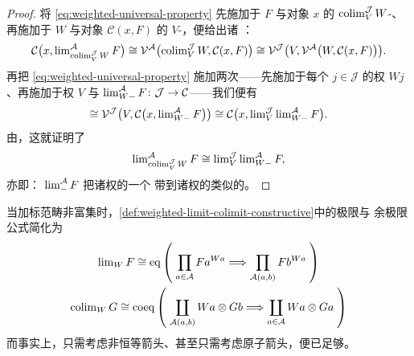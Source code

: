 \begin{proof}
将\trUniversalProperty{} \eqref{eq:weighted-universal-property} 先施加于%
\trDiagram{} $F$ 与对象 $x$ 的 $\operatorname{colim}^{\mathcal{J}}_{V}W$-\trWeightedLimit、再施加于%
\trDiagram{} $W$ 与对象 $\mathcal{C}(x,F)$ 的 $V$-\trWeightedColimit，便给出诸%
\trIsomorphism：
\[ \mathcal{C}\bigl(x,\operatorname{lim}^{\mathcal{A}}_{\operatorname{colim}^{\mathcal{J}}_{V}W}F\bigr)
   \cong\mathcal{V}^{\mathcal{A}}\bigl(\operatorname{colim}^{\mathcal{J}}_{V}W,\mathcal{C}(x,F)\bigr)
   \cong\mathcal{V}^{\mathcal{J}}\bigl(V,\mathcal{V}^{\mathcal{A}}\bigl(W,\mathcal{C}(x,F)\bigr)\bigr). \]
再把 \eqref{eq:weighted-universal-property} 施加两次——先施加于每个
$j\in\mathcal{J}$ 的权 $Wj$、再施加于权 $V$ 与\trDiagram{}
$\operatorname{lim}^{\mathcal{A}}_{W-}F\colon\mathcal{J}\to\mathcal{C}$——我们便有
\[ \cong\mathcal{V}^{\mathcal{J}}\bigl(V,\mathcal{C}\bigl(x,\operatorname{lim}^{\mathcal{A}}_{W-}F\bigr)\bigr)
   \cong\mathcal{C}\bigl(x,\operatorname{lim}^{\mathcal{J}}_{V}\operatorname{lim}^{\mathcal{A}}_{W-}F\bigr). \]
由\trYonedaLemma，这就证明了
\[ \operatorname{lim}^{\mathcal{A}}_{\operatorname{colim}^{\mathcal{J}}_{V}W}F
   \cong\operatorname{lim}^{\mathcal{J}}_{V}\operatorname{lim}^{\mathcal{A}}_{W-}F, \]
亦即：\trWeightedLimit{}\trFunctor{} $\operatorname{lim}^{\mathcal{A}}_{-}F$ 把诸权的一个%
\trWeightedColimit{}带到诸权的类似的\trWeightedLimit。
\end{proof}

\begin{remark}[对非富集的加标范畴]\label{rem:unenriched-indexing-categories}
当加标范畴非富集时，\cref{def:weighted-limit-colimit-constructive}中的极限与
余极限公式简化为
\begin{gather*}
\operatorname{lim}_{W}F\cong\mathrm{eq}\left(\;
  \prod_{a\in\mathcal{A}}Fa^{Wa}
  \Longrightarrow
  \prod_{\mathcal{A}(a,b)}Fb^{Wa}\;\right)\\
\operatorname{colim}_{W}G\cong\mathrm{coeq}\left(\;
  \coprod_{\mathcal{A}(a,b)}Wa\otimes Gb
  \Longrightarrow
  \coprod_{a\in\mathcal{A}}Wa\otimes Ga\;\right)
\end{gather*}
而事实上，只需考虑非恒等箭头、甚至只需考虑原子箭头，便已足够。
\end{remark}

